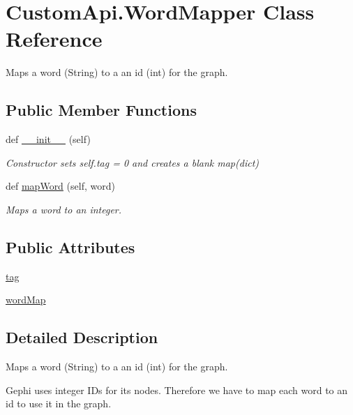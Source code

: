 \hypertarget{class_custom_api_1_1_word_mapper}{}\section{Custom\+Api.\+Word\+Mapper Class Reference}
\label{class_custom_api_1_1_word_mapper}


Maps a word (String) to a an id (int) for the graph.  


\subsection*{Public Member Functions}
\begin{DoxyCompactItemize}
\item 
def \mbox{\hyperlink{class_custom_api_1_1_word_mapper_a63da7e3e9754aa8b809c7987783e335d}{\+\_\+\+\_\+init\+\_\+\+\_\+}} (self)
\begin{DoxyCompactList}\small\item\em Constructor sets self.\+tag = 0 and creates a blank map(dict) \end{DoxyCompactList}\item 
def \mbox{\hyperlink{class_custom_api_1_1_word_mapper_a7fa979bd96ee31d9871fdd31dfd755b6}{map\+Word}} (self, word)
\begin{DoxyCompactList}\small\item\em Maps a word to an integer. \end{DoxyCompactList}\end{DoxyCompactItemize}
\subsection*{Public Attributes}
\begin{DoxyCompactItemize}
\item 
\mbox{\hyperlink{class_custom_api_1_1_word_mapper_a3827c888795971e8ec6fa62cf94ff9ee}{tag}}
\item 
\mbox{\hyperlink{class_custom_api_1_1_word_mapper_adffab40f8342bf2f07dce02ec1accb25}{word\+Map}}
\end{DoxyCompactItemize}


\subsection{Detailed Description}
Maps a word (String) to a an id (int) for the graph. 

Gephi uses integer I\+Ds for its nodes. Therefore we have to map each word to an id to use it in the graph. 

